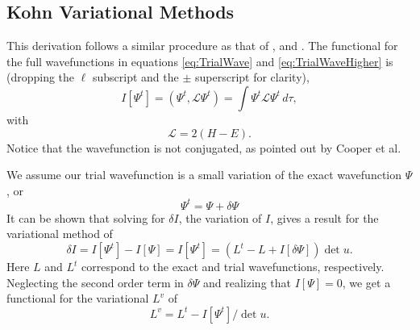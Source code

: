 \documentclass[preprint,showpacs,preprintnumbers,amsmath,amssymb]{revtex4}
\newcommand{\beq}{\begin{equation}}
\newcommand{\eeq}{\end{equation}}
\begin{document}
\subsection{Kohn Variational Methods}
\label{sec:Kohn}

This derivation follows a similar procedure as that of \cite{Lucchese1989}, \cite{Cooper2010} and \cite{Armour1991}.
The functional for the full wavefunctions in equations \ref{eq:TrialWave} and \ref{eq:TrialWaveHigher} is (dropping the $\ell$ subscript and the $\pm$ superscript for clarity),
\begin{equation}
I[\Psi^t] = \left(\Psi^t, \mathcal{L} \Psi^t \right) = \int \Psi^t \mathcal{L} \Psi^t \,d\tau,
\label{eq:IlDefPsi}
\end{equation}
with
\beq
\mathcal{L} = 2(H - E).
\label{eq:LDef}
\eeq
Notice that the wavefunction is not conjugated, as pointed out by Cooper et al. \cite{Cooper2010}

We assume our trial wavefunction is a small variation of the exact wavefunction $\Psi$, or
\beq
\Psi^t = \Psi + \delta \Psi
\label{eq:PsiTrialRelation}
\eeq
It can be shown that solving for $\delta I$, the variation of $I$, gives a result for the variational method of
\beq
\delta I = I[\Psi^t] - I[\Psi] = I[\Psi^t] = (L^t - L + I[\delta \Psi]) \det u.
\label{eq:IlPsiVariation}
\eeq
Here $L$ and $L^t$ correspond to the exact and trial wavefunctions, respectively. Neglecting the second order term in $\delta \Psi$ and realizing that $I[\Psi] = 0$, we get a functional for the variational $L^v$ of
\beq
L^v = L^t - I[\Psi^t] / \det u.
\label{eq:ComplexKohnVariation}
\eeq
\end{document}
